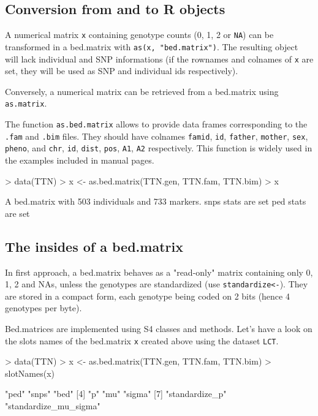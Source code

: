 \documentclass{article}
\renewenvironment{Schunk}{\vspace{\topsep}}{\vspace{\topsep}}
\begin{document}
\subsection{Conversion from and to R objects}

  A numerical matrix \verb!x! containing genotype counts (0, 1, 2 or \verb!NA!) can be 
  transformed in a bed.matrix with \verb!as(x, "bed.matrix")!. The resulting
  object will lack individual and SNP informations (if the rownames and colnames
  of \verb!x! are set, they will be used as SNP and individual ids respectively).

  Conversely, a numerical matrix can be retrieved from a bed.matrix using \verb!as.matrix!. 
  
  The function \verb!as.bed.matrix! allows to provide data frames corresponding to 
  the \verb!.fam! and \verb!.bim! files. They should have colnames \verb!famid!, 
  \verb!id!, \verb!father!, \verb!mother!, \verb!sex!, \verb!pheno!, and \verb!chr!, \verb!id!, 
  \verb!dist!, \verb!pos!, \verb!A1!, \verb!A2! respectively. This function is widely used in
  the examples included in manual pages.

\begin{Schunk}
\begin{Sinput}
> data(TTN)
> x <- as.bed.matrix(TTN.gen, TTN.fam, TTN.bim)
> x
\end{Sinput}
\begin{Soutput}
A bed.matrix with 503 individuals and 733 markers.
snps stats are set
ped stats are set
\end{Soutput}
\end{Schunk}

\subsection{The insides of a bed.matrix}

  In first approach, a bed.matrix behaves as a "read-only" matrix containing only 
  0, 1, 2 and NAs, unless the genotypes are standardized (use \verb!standardize<-!).
  They are stored in a compact form, each genotype being coded on 2 bits (hence
  4 genotypes per byte). 

  Bed.matrices are implemented using S4 classes and methods.
  Let's have a look on the slots names of the bed.matrix \verb!x! created above using the dataset \verb!LCT!.

\begin{Schunk}
\begin{Sinput}
> data(TTN)
> x <- as.bed.matrix(TTN.gen, TTN.fam, TTN.bim)
> slotNames(x)
\end{Sinput}
\begin{Soutput}
[1] "ped"                  "snps"                 "bed"                 
[4] "p"                    "mu"                   "sigma"               
[7] "standardize_p"        "standardize_mu_sigma"
\end{Soutput}
\end{Schunk}
\end{document}
